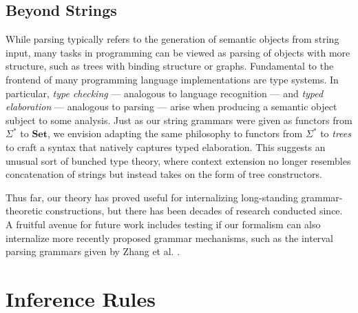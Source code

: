 \documentclass[acmsmall,screen,nonacm]{acmart}
\newcommand{\String}{\Sigma^{*}}
\newcommand{\Set}{\mathbf{Set}}
\begin{document}
\subsection{Beyond Strings}
\label{subsec:beyond}

While parsing typically refers to the generation of semantic
objects from string input, many tasks in programming can be
viewed as parsing of objects with more structure, such as
trees with binding structure or graphs. Fundamental to the
frontend of many
programming language implementations are type systems. In
particular, \emph{type checking}
--- analogous to language recognition --- and \emph{typed
  elaboration} --- analogous to parsing --- arise when
producing a semantic object subject to some analysis. Just
as our string grammars were given as functors from $\String$
to $\Set$, we envision adapting the same philosophy
to functors from $\String$ to \emph{trees} to craft a syntax
that natively captures typed elaboration. This suggests an
unusual sort of bunched type theory, where context extension
no longer resembles concatenation of strings but instead
takes on the form of tree constructors.

Thus far, our theory has proved useful for internalizing long-standing
grammar-theoretic constructions, but there has been decades of research
conducted since. A fruitful avenue for future work includes
testing if our formalism can also internalize more recently proposed grammar
mechanisms, such as the interval parsing grammars given by Zhang et al. \cite{zhangIntervalParsingGrammars2023}.

\newpage




\newpage

\appendix

\section{Inference Rules}
\label{sec:infer}
\end{document}
